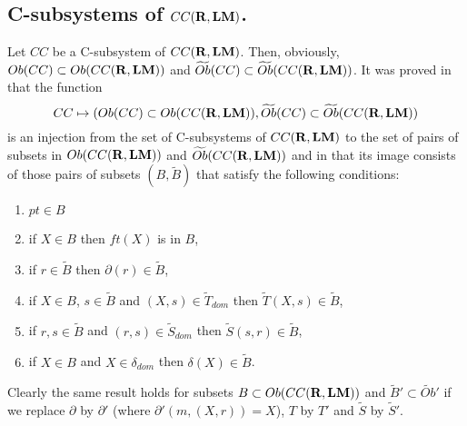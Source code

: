 \documentclass[11pt]{article}
\newcommand{\rr}{{\bf R}}
\newcommand{\lm}{{\bf LM}}
\newcommand{\wt}{\widetilde}
\begin{document}
\subsection{C-subsystems of $CC(\rr,\lm)$.}
%
Let $CC$ be a C-subsystem of $CC(\rr,\lm)$.  Then, obviously, $Ob(CC)\subset Ob(CC(\rr,\lm))$ and $\wt{Ob}(CC)\subset \wt{Ob}(CC(\rr,\lm))$. It was proved in \cite[Lemma 4.1]{Csubsystems} that the function 
%
$$CC\mapsto (Ob(CC)\subset Ob(CC(\rr,\lm)),\wt{Ob}(CC)\subset \wt{Ob}(CC(\rr,\lm))$$
%
is an injection from the set of C-subsystems of $CC(\rr,\lm)$ to the set of pairs of subsets in $Ob(CC(\rr,\lm))$ and $\wt{Ob}(CC(\rr,\lm))$ and in \cite[Proposition 4.3]{Csubsystems} that its image consists of those pairs of subsets $(B,\wt{B})$ that satisfy the following conditions:
%
\begin{enumerate}
\item $pt\in B$
\item if $X\in B$ then $ft(X)$ is in $B$,
\item if $r\in \wt{B}$ then $\partial(r)\in \wt{B}$,
\item if $X\in B$, $s\in \wt{B}$ and $(X,s)\in \wt{T}_{dom}$ then $\wt{T}(X,s)\in \wt{B}$,
\item if $r,s\in \wt{B}$ and $(r,s)\in \wt{S}_{dom}$ then $\wt{S}(s,r)\in \wt{B}$,
\item if $X\in B$ and $X\in \delta_{dom}$ then $\delta(X)\in \wt{B}$.
\end{enumerate}
%
Clearly the same result holds for subsets $B\subset Ob(CC(\rr,\lm))$ and $\wt{B}'\subset \wt{Ob}'$ if we replace $\partial$ by $\partial'$ (where $\partial'(m,(X,r))=X$),  $T$ by $T'$ and $\wt{S}$ by $\wt{S}'$.
\end{document}
